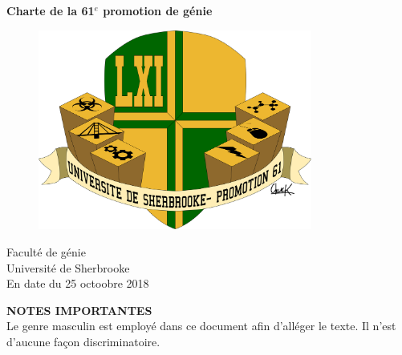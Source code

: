 \documentclass{article}
\renewcommand{\(}{\left}
\renewcommand{\)}{\right)}
\renewcommand{\[}{\left[}
\renewcommand{\]}{\right]}
\begin{document}
\hyphenchar{}
\begin{titlepage}

\vspace*{4cm}
\begin{center}
\huge \textbf{Charte de la 61$^e$ promotion de génie} \\
\end{center}
\vspace*{2cm}

\begin{figure}[H]
\begin{center}
\includegraphics[width=9cm]{LOGO61.png}
\end{center}
\end{figure}
\null
\vfill

\begin{center}
\Large
Faculté de génie \\
Université de Sherbrooke \\
En date du 25 octoobre 2018\\
\end{center}
\end{titlepage}

\setcounter{page}{1}

\tableofcontents
\newpage

\setcounter{page}{1}


\noindent \textbf{\LARGE{NOTES IMPORTANTES}} \\

\noindent Le genre masculin est employé dans ce document afin d'alléger le texte. Il n'est d'aucune façon discriminatoire. \\
\end{document}

